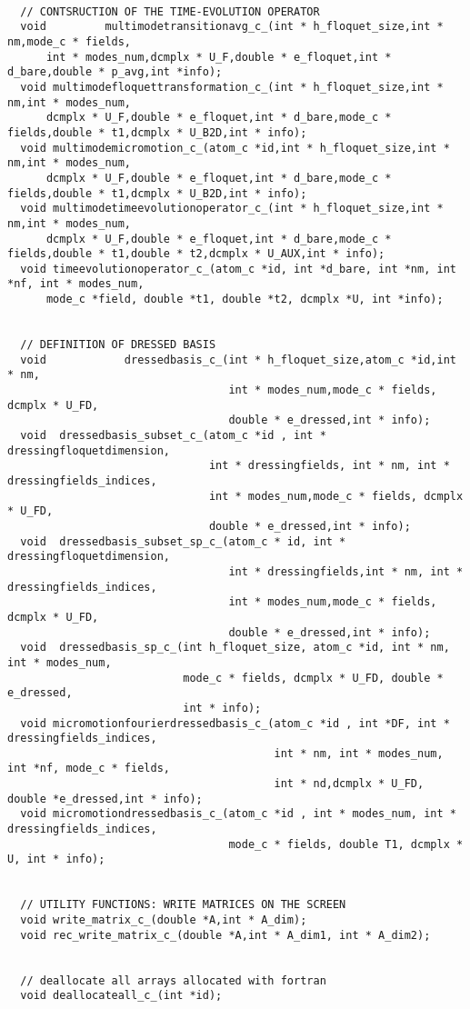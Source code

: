 \documentclass[10pt,a4paper]{article}
\begin{document}
\begin{verbatim}
  
  // CONTSRUCTION OF THE TIME-EVOLUTION OPERATOR
  void         multimodetransitionavg_c_(int * h_floquet_size,int * nm,mode_c * fields,
      int * modes_num,dcmplx * U_F,double * e_floquet,int * d_bare,double * p_avg,int *info);
  void multimodefloquettransformation_c_(int * h_floquet_size,int * nm,int * modes_num,
      dcmplx * U_F,double * e_floquet,int * d_bare,mode_c * fields,double * t1,dcmplx * U_B2D,int * info); 
  void multimodemicromotion_c_(atom_c *id,int * h_floquet_size,int * nm,int * modes_num,
      dcmplx * U_F,double * e_floquet,int * d_bare,mode_c * fields,double * t1,dcmplx * U_B2D,int * info); 
  void multimodetimeevolutionoperator_c_(int * h_floquet_size,int * nm,int * modes_num,
      dcmplx * U_F,double * e_floquet,int * d_bare,mode_c * fields,double * t1,double * t2,dcmplx * U_AUX,int * info);
  void timeevolutionoperator_c_(atom_c *id, int *d_bare, int *nm, int *nf, int * modes_num, 
      mode_c *field, double *t1, double *t2, dcmplx *U, int *info); 

    
  // DEFINITION OF DRESSED BASIS
  void            dressedbasis_c_(int * h_floquet_size,atom_c *id,int * nm, 
                                  int * modes_num,mode_c * fields, dcmplx * U_FD, 
                                  double * e_dressed,int * info); 
  void  dressedbasis_subset_c_(atom_c *id , int * dressingfloquetdimension,
                               int * dressingfields, int * nm, int * dressingfields_indices, 
                               int * modes_num,mode_c * fields, dcmplx * U_FD, 
                               double * e_dressed,int * info);
  void  dressedbasis_subset_sp_c_(atom_c * id, int * dressingfloquetdimension,
                                  int * dressingfields,int * nm, int * dressingfields_indices,
                                  int * modes_num,mode_c * fields, dcmplx * U_FD, 
                                  double * e_dressed,int * info);
  void  dressedbasis_sp_c_(int h_floquet_size, atom_c *id, int * nm, int * modes_num, 
                           mode_c * fields, dcmplx * U_FD, double * e_dressed, 
                           int * info);
  void micromotionfourierdressedbasis_c_(atom_c *id , int *DF, int * dressingfields_indices, 
                                         int * nm, int * modes_num, int *nf, mode_c * fields,
                                         int * nd,dcmplx * U_FD, double *e_dressed,int * info);
  void micromotiondressedbasis_c_(atom_c *id , int * modes_num, int * dressingfields_indices, 
                                  mode_c * fields, double T1, dcmplx * U, int * info);

    
  // UTILITY FUNCTIONS: WRITE MATRICES ON THE SCREEN
  void write_matrix_c_(double *A,int * A_dim);
  void rec_write_matrix_c_(double *A,int * A_dim1, int * A_dim2);

  
  // deallocate all arrays allocated with fortran
  void deallocateall_c_(int *id);
\end{verbatim}
\newpage
\end{document}
